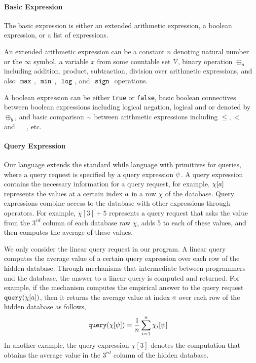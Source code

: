 \paragraph{Basic Expression}
The basic expression is
either an extended arithmetic expression, a boolean expression, or a list of expressions.

An extended arithmetic expression can be a constant $n$ denoting natural number or the $\infty$ symbol, a variable $x$ from some countable set $\mathcal{V}$, binary operation $\oplus_a$ including addition, product, subtraction, division over arithmetic expressions, and also $~\mathtt{max}~$, $~\mathtt{min}~$, $~\mathtt{log}~$, and $~\mathtt{sign}~$ operations. 
%

A boolean expression can be either {\tt true} or {\tt false}, basic boolean connectives between boolean expressions including logical negation, logical and or denoted by $\oplus_b$, and basic comparison $\sim$ between arithmetic expressions including $\leq, <$ and $=$, etc.

\paragraph{Query Expression}
Our language extends the standard while language with primitives for queries, 
where a query request is specified by a query expression $\psi$. 
A query expression contains the necessary information for a query request, for example, 
$\chi[a]$ represents the values at a certain index $a$ in a row $\chi$ of the database. 
Query expressions combine access to the database with other expressions through operators.
For example, $\chi[3] + 5$ represents a query request that asks the value from the $3^{rd}$ column of each database raw $\chi$, adds 5 to each of these values, 
and then computes the average of these values.

We only consider the linear query request in our program.
A linear query computes the average value of a certain query expression over each row of the hidden database.
Through mechanisms that intermediate between programmers and the database, the answer to a linear query is computed and returned.
For example, if the mechanism computes the empirical answer to the query request
$ {\tt query}(\chi[a])$, then it returns the average value at index $a$ over each row of the hidden database as follows,
 \[
 {\tt query}(\chi[\psi]) = \frac{1}{n}\sum\limits_{i = 1}^{n}\chi_i[\psi]
 \]
In another example, the query expression $\chi[3]$ denotes the computation that
obtains
the average value in the $3^{rd}$ column of the hidden database.

